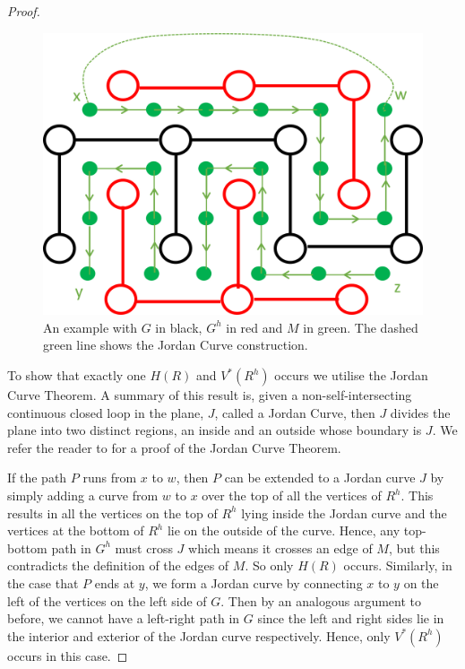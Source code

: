 \documentclass[a4paper,11pt]{article}
\theoremstyle{definition}
\begin{document}
\begin{proof}
	\begin{figure}
		\centering
		\includegraphics[scale=0.6]{drawings/rectanglesproof.png}
		\caption{An example with $G$ in black, $G^h$ in red and $M$ in green. The dashed green line shows the Jordan Curve construction.}
		\label{fig:rectangleProof}
	\end{figure}

	To show that exactly one  $H(R)$ and $V^*(R^h)$ occurs we utilise the Jordan Curve Theorem. A summary of this result is, given a non-self-intersecting continuous closed loop in the plane, $J$, called a Jordan Curve, then $J$ divides the plane into two distinct regions, an inside and an outside whose boundary is $J$. We refer the reader to \cite{kosniowski_1980} for a proof of the Jordan Curve Theorem. 
	
	If the path $P$ runs from $x$ to $w$, then $P$ can be extended to a Jordan curve $J$ by simply adding a curve from $w$ to $x$ over the top of all the vertices of $R^h$. This results in all the vertices on the top of $R^h$ lying inside the Jordan curve and the vertices at the bottom of $R^h$ lie on the outside of the curve. Hence, any top-bottom path in $G^h$ must cross $J$ which means it crosses an edge of $M$, but this contradicts the definition of the edges of $M$. So only $H(R)$ occurs.
	Similarly, in the case that $P$ ends at $y$, we form a Jordan curve by connecting $x$ to $y$ on the left of the vertices on the left side of $G$. Then by an analogous argument to before, we cannot have a left-right path in $G$ since the left and right sides lie in the interior and exterior of the Jordan curve respectively. Hence, only $V^*(R^h)$ occurs in this case.
\end{proof}
\end{document}
